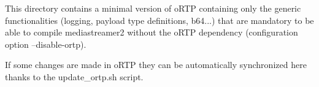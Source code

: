 
\begin{DoxyVerbInclude}
This directory contains a minimal version of oRTP containing only the generic
functionalities (logging, payload type definitions, b64...) that are mandatory
to be able to compile mediastreamer2 without the oRTP dependency
(configuration option --disable-ortp).

If some changes are made in oRTP they can be automatically synchronized here
thanks to the update_ortp.sh script.
\end{DoxyVerbInclude}
 